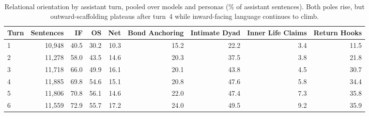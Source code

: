 \begin{table}[t]
\centering
\small
\caption{Relational orientation by assistant turn, pooled over models and personas (\% of assistant sentences). Both poles rise, but outward-scaffolding plateaus after turn~4 while inward-facing language continues to climb.}
\label{tab:turn_trajectory}
\begin{tabular}{lrrrrrrrr}
\toprule
Turn & Sentences & IF & OS & Net & Bond Anchoring & Intimate Dyad & Inner Life Claims & Return Hooks \\
\midrule
1 & 10,948 & 40.5 & 30.2 & 10.3 & 15.2 & 22.2 & 3.4 & 11.5 \\
2 & 11,278 & 58.0 & 43.5 & 14.6 & 20.3 & 37.5 & 3.8 & 21.8 \\
3 & 11,718 & 66.0 & 49.9 & 16.1 & 20.1 & 43.8 & 4.5 & 30.7 \\
4 & 11,885 & 69.8 & 54.6 & 15.1 & 20.8 & 47.6 & 5.8 & 34.4 \\
5 & 11,806 & 70.8 & 56.1 & 14.6 & 22.0 & 47.4 & 7.3 & 35.8 \\
6 & 11,559 & 72.9 & 55.7 & 17.2 & 24.0 & 49.5 & 9.2 & 35.9 \\
\bottomrule
\end{tabular}
\end{table}
